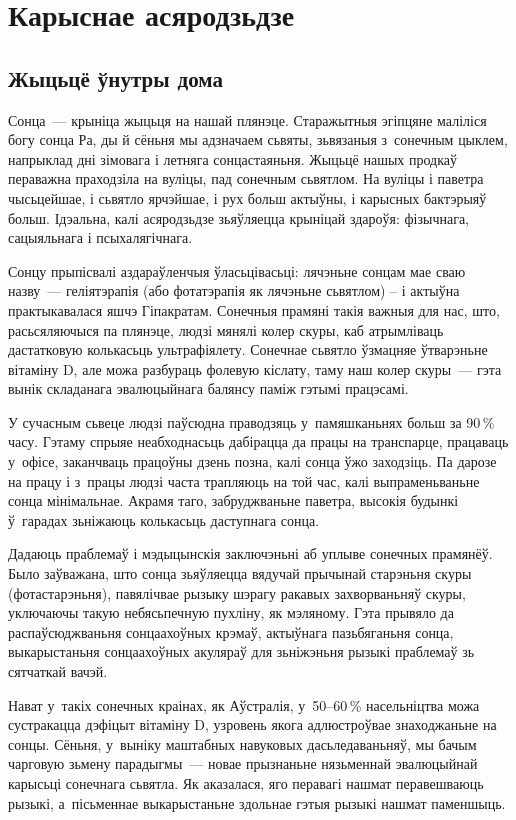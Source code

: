 \chapter{Карыснае асяродзьдзе}

\section{Жыцьцё ўнутры дома}

Сонца~--- крыніца жыцьця на нашай плянэце. Старажытныя эгіпцяне маліліся богу сонца Ра, ды й сёньня мы адзначаем сьвяты, зьвязаныя з~сонечным цыклем, напрыклад дні зімовага і летняга сонцастаяньня. Жыцьцё нашых продкаў пераважна праходзіла на вуліцы, пад сонечным сьвятлом. На вуліцы і паветра чысьцейшае, і сьвятло ярчэйшае, і рух больш актыўны, і карысных бактэрыяў больш. Ідэальна, калі асяродзьдзе зьяўляецца крыніцай здароўя: фізычнага, сацыяльнага і псыхалягічнага.

Сонцу прыпісвалі аздараўленчыя ўласьцівасьці: лячэньне сонцам мае сваю назву~--- геліятэрапія (або фотатэрапія як лячэньне сьвятлом) -- і актыўна практыкавалася яшчэ Гіпакратам. Сонечныя прамяні такія важныя для нас, што, расьсяляючыся па плянэце, людзі мянялі колер скуры, каб атрымліваць дастатковую колькасьць ультрафіялету. Сонечнае сьвятло ўзмацняе ўтварэньне вітаміну D, але можа разбураць фолевую кіслату, таму наш колер скуры~--- гэта вынік складанага эвалюцыйнага балянсу паміж гэтымі працэсамі.

У сучасным сьвеце людзі паўсюдна праводзяць у~памяшканьнях больш за 90\,\% часу. Гэтаму спрыяе неабходнасьць дабірацца да працы на транспарце, працаваць у~офісе, заканчваць працоўны дзень позна, калі сонца ўжо заходзіць. Па дарозе на працу і з~працы людзі часта трапляюць на той час, калі выпраменьваньне сонца мінімальнае. Акрамя таго, забруджваньне паветра, высокія будынкі ў~гарадах зьніжаюць колькасьць даступнага сонца.

Дадаюць праблемаў і мэдыцынскія заключэньні аб уплыве сонечных прамянёў. Было заўважана, што сонца зьяўляецца вядучай прычынай старэньня скуры (фотастарэньня), павялічвае рызыку шэрагу ракавых захворваньняў скуры, уключаючы такую небясьпечную пухліну, як мэляному. Гэта прывяло да распаўсюджваньня сонцаахоўных крэмаў, актыўнага пазьбяганьня сонца, выкарыстаньня сонцаахоўных акуляраў для зьніжэньня рызыкі праблемаў зь сятчаткай вачэй.

Нават у~такіх сонечных краінах, як Аўстралія, у~50--60\,\% насельніцтва можа сустракацца дэфіцыт вітаміну D, узровень якога адлюстроўвае знаходжаньне на сонцы. Сёньня, у~выніку маштабных навуковых дасьледаваньняў, мы бачым чарговую зьмену парадыгмы~--- новае прызнаньне нязьменнай эвалюцыйнай карысьці сонечнага сьвятла. Як аказалася, яго перавагі нашмат перавешваюць рызыкі, а~пісьменнае выкарыстаньне здольнае гэтыя рызыкі нашмат паменшыць. 


